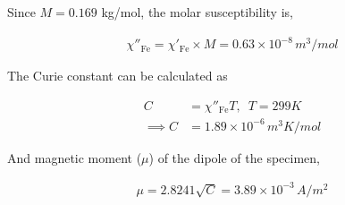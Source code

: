     Since $M = 0.169$ kg/mol, the molar susceptibility is,

    \begin{align*}
        \chi''_\text{Fe} = \chi'_\text{Fe}\times M = 0.63\times10^{-8}\,m^3/mol
    \end{align*}

    The Curie constant can be calculated as

    \begin{align*}
        C &= \chi''_\text{Fe}T,\,\,\, T=299K \\
        \implies C &= 1.89\times10^{-6}\,m^3 K/mol
    \end{align*}

    And magnetic moment ($\mu$) of the dipole of the specimen,

    \begin{align*}
       \mu = 2.8241\sqrt{C} = 3.89\times10^{-3}\,A/m^2
    \end{align*}


